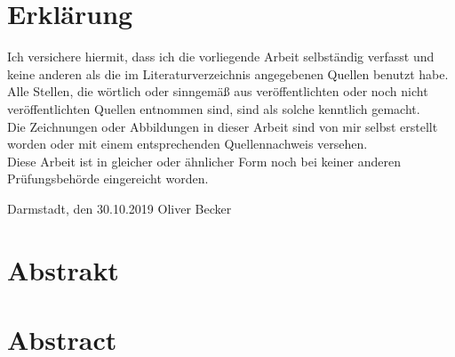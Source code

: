 \documentclass[11pt]{scrartcl}
\begin{document}
\section*{Erklärung}
Ich versichere hiermit, dass ich die vorliegende Arbeit selbständig verfasst und keine anderen
als die im Literaturverzeichnis angegebenen Quellen benutzt habe.\\
Alle Stellen, die wörtlich oder sinngemäß aus veröffentlichten oder noch nicht veröffentlichten
Quellen entnommen sind, sind als solche kenntlich gemacht.\\
Die Zeichnungen oder Abbildungen in dieser Arbeit sind von mir selbst erstellt worden oder mit
einem entsprechenden Quellennachweis versehen.\\
Diese Arbeit ist in gleicher oder ähnlicher Form noch bei keiner anderen Prüfungsbehörde
eingereicht worden.\\
\par\vspace{2cm}\noindent
Darmstadt, den 30.10.2019 \hspace*{0pt}\hfill Oliver Becker
\clearpage

\section*{Abstrakt}

\section*{Abstract}
\clearpage

\end{document}
